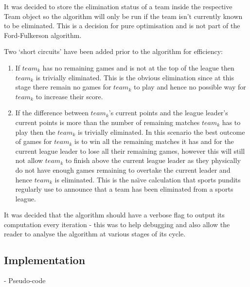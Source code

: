 It was decided to store the elimination status of a team inside the
respective Team object so the algorithm will only be run if the team isn't
currently known to be eliminated. This is a decision for pure optimisation and 
is not part of the Ford-Fulkerson algorithm.

Two `short circuits' have been added prior to the algorithm for efficiency:
\begin{enumerate}
\item If $team_k$ has no remaining games and is not at the top of the league
then $team_k$ is trivially eliminated. This is the obvious elimination since
at this stage there remain no games for $team_k$ to play and hence no possible
way for $team_k$ to increase their score.
\item If the difference between $team_k$'s current points and the league 
leader's current points is more than the number of remaining matches $team_k$ 
has to play then the $team_k$ is trivially eliminated. In this scenario the best 
outcome of games for $team_k$ is to win all the remaining matches it has and for 
the current league leader to lose all their remaining games, however this will
still not allow $team_k$ to finish above the current league leader as they
physically do not have enough games remaining to overtake the current leader and 
hence $team_k$ is eliminated. This is the na\"{\i}ve calculation that sports 
pundits regularly use to announce that a team has been eliminated from a sports 
league.
\end{enumerate}

It was decided that the algorithm should have a verbose flag to output
its computation every iteration - this was to help debugging and also
allow the reader to analyse the algorithm at various stages of its
cycle. 

\subsection{Implementation}

- Pseudo-code


